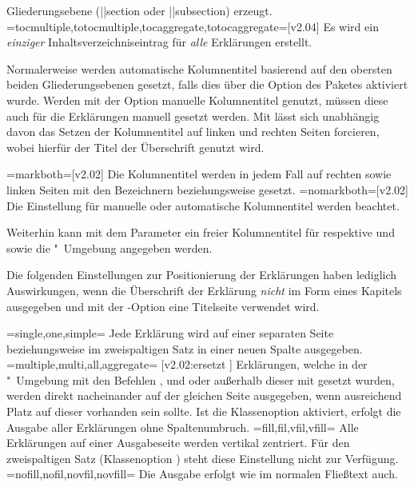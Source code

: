 \begin{DeclareEntity*}{}
\begin{DeclareEntity*}{}
\begin{DeclareEntity*}{}
\begin{Declaration}
\begin{DeclareValues}
  Gliederungsebene (\Macro||{section} oder \Macro||{subsection}) erzeugt.
\itemval=tocmultiple,totocmultiple,tocaggregate,totocaggregate=[v2.04]
  Es wird ein \emph{einziger} Inhaltsverzeichniseintrag für \emph{alle} 
  Erklärungen erstellt.
\end{DeclareValues}
%
Normalerweise werden automatische Kolumnentitel basierend auf den obersten 
beiden Gliederungsebenen gesetzt, falls dies über die Option  
des Paketes  aktiviert wurde. Werden mit der Option 
 manuelle Kolumnentitel genutzt, müssen diese auch für die 
Erklärungen manuell gesetzt werden. Mit  lässt 
sich unabhängig davon das Setzen der Kolumnentitel auf linken und rechten 
Seiten forcieren, wobei hierfür der Titel der Überschrift genutzt wird.
%
\begin{DeclareValues}
\itemval=markboth=[v2.02]
  Die Kolumnentitel werden in jedem Fall auf rechten sowie linken Seiten mit 
  den Bezeichnern  beziehungsweise  
  gesetzt.
\itemval=nomarkboth=[v2.02]
  Die Einstellung für manuelle oder automatische Kolumnentitel werden beachtet.
\end{DeclareValues}
%
Weiterhin kann mit dem Parameter  ein 
freier Kolumnentitel für  respektive  
und  sowie die "~Umgebung angegeben 
werden.

Die folgenden Einstellungen zur Positionierung der Erklärungen haben lediglich 
Auswirkungen, wenn die Überschrift der Erklärung \emph{nicht} im Form eines 
Kapitels ausgegeben und mit der \KOMAScript-Option  eine 
Titelseite verwendet wird.
%
\begin{DeclareValues}
\itemval=single,one,simple=
  Jede Erklärung wird auf einer separaten Seite
  beziehungsweise im zweispaltigen Satz in einer neuen Spalte ausgegeben.
\itemval=multiple,multi,all,aggregate=%
    [v2.02:ersetzt ]
  Erklärungen, welche in der "~Umgebung mit den 
  Befehlen ,  und  oder 
  außerhalb dieser mit  gesetzt wurden, werden direkt 
  nacheinander auf der gleichen Seite ausgegeben, wenn ausreichend Platz auf 
  dieser vorhanden sein sollte. Ist die Klassenoption  
  aktiviert, erfolgt die Ausgabe aller Erklärungen ohne Spaltenumbruch.
\itemval=fill,fil,vfil,vfill=
  Alle Erklärungen auf einer Ausgabeseite werden vertikal zentriert. Für 
  den zweispaltigen Satz (Klassenoption ) steht diese 
  Einstellung nicht zur Verfügung.
\itemval=nofill,nofil,novfil,novfill=
  Die Ausgabe erfolgt wie im normalen Fließtext auch.
\end{DeclareValues}
\end{Declaration}


\end{DeclareEntity*}
\end{DeclareEntity*}
\end{DeclareEntity*}
